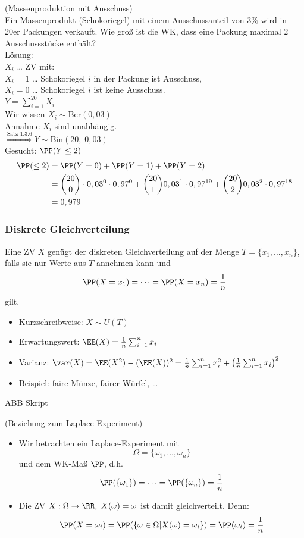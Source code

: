  (Massenproduktion mit Ausschuss)\\
Ein Massenprodukt (Schokoriegel) mit einem Ausschussanteil von $3\%$ wird in 20er Packungen verkauft. Wie groß ist die WK, dass eine Packung maximal 2 Ausschussstücke enthält?\\
Lösung:\\
$X_i$ … ZV mit:\\
$X_i=1 $ … Schokoriegel $i$ in der Packung ist Ausschuss,\\
$X_i = 0 $ … Schokoriegel $i$ ist keine Ausschuss.\\
$Y=\sum_{i=1}^{20}X_i$\\
Wir wissen $X_i \sim \mathrm{Ber}(0,03)$\\
Annahme $X_i$ sind unabhängig.\\
$\overset{\text{Satz 1.3.6}}{\Longrightarrow} Y \sim \mathrm{Bin}(20,\; 0,03)$\\
Gesucht: $\PP(Y \leq 2)$
\begin{align*}
\PP(\leq 2)&= \PP(Y=0)+\PP(Y=1) + \PP(Y=2)\\
&= \binom{20}{0}\cdot 0,03^0 \cdot 0,97^0 + \binom{20}{1} 0,03^1 \cdot 0,97^{19} + \binom{20}{2} 0,03^2 \cdot 0,97^{18}\\
&= 0,979
\end{align*}

\subsubsection{Diskrete Gleichverteilung}

 Eine ZV $X$ genügt der diskreten Gleichverteilung auf der Menge $T=\{x_1,\dots,x_n\}$, falls sie nur Werte aus $T$ annehmen kann und 
$$\PP(X=x_1) = \dots = \PP(X=x_n) = \frac{1}{n}$$
gilt.

\begin{itemize}
\item Kurzschreibweise: $X\sim U(T)$
\item Erwartungswert: $\EE(X)=\frac{1}{n}\sum_{i=1}^n x_i$
\item Varianz: $\var(X)=\EE(X^2)-(\EE(X))^2 = \frac{1}{n} \sum_{i=1}^n x_i^2+\left(\frac{1}{n}\sum_{i=1}^n x_i\right)^2$
\item Beispiel: faire Münze, fairer Würfel, …
\end{itemize}
ABB Skript

 (Beziehung zum Laplace-Experiment)
\begin{itemize}
\item Wir betrachten ein Laplace-Experiment mit 
$$\Omega = \{\omega_1, \dots, \omega_n\}$$ 
und dem WK-Maß $\PP$, d.h. 
$$\PP(\{\omega_1\})=\dots= \PP(\{\omega_n\})=\frac{1}{n}$$
\item Die ZV $X:\Omega \to \RR, \; X(\omega) = \omega$ ist damit gleichverteilt. Denn: 
$$\PP(X=\omega_i)=\PP(\{\omega\in \Omega | X(\omega) = \omega_i\})=\PP(\omega_i)=\frac{1}{n}$$
\end{itemize}

